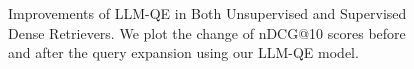 

\begin{figure}[t]
    \centering
    
    \caption{Improvements of LLM-QE in Both Unsupervised and Supervised Dense Retrievers. We plot the change of nDCG@10 scores before and after the query expansion using our LLM-QE model.}
    \label{fig:imp}
\end{figure}